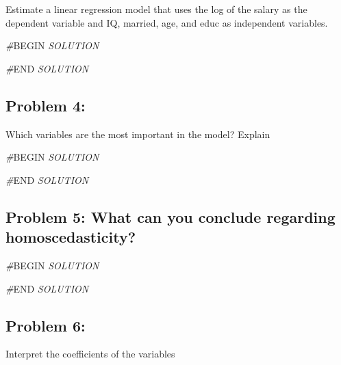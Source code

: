 \documentclass[
]{article}
\newenvironment{Shaded}{\begin{snugshade}}{\end{snugshade}}
\newcommand{\CommentTok}[1]{\textcolor[rgb]{0.56,0.35,0.01}{\textit{#1}}}
\newcommand{\RegionMarkerTok}[1]{#1}
\begin{document}
Estimate a linear regression model that uses the log of the salary as
the dependent variable and IQ, married, age, and educ as independent
variables.

\begin{Shaded}
\begin{Highlighting}[]
\CommentTok{\#}\RegionMarkerTok{BEGIN}\CommentTok{ SOLUTION}


\CommentTok{\#}\RegionMarkerTok{END}\CommentTok{ SOLUTION}
\end{Highlighting}
\end{Shaded}

\hypertarget{problem-4}{%
\subsection{Problem 4:}\label{problem-4}}

Which variables are the most important in the model? Explain

\begin{Shaded}
\begin{Highlighting}[]
\CommentTok{\#}\RegionMarkerTok{BEGIN}\CommentTok{ SOLUTION}


\CommentTok{\#}\RegionMarkerTok{END}\CommentTok{ SOLUTION}
\end{Highlighting}
\end{Shaded}

\hypertarget{problem-5-what-can-you-conclude-regarding-homoscedasticity}{%
\subsection{Problem 5: What can you conclude regarding
homoscedasticity?}\label{problem-5-what-can-you-conclude-regarding-homoscedasticity}}

\begin{Shaded}
\begin{Highlighting}[]
\CommentTok{\#}\RegionMarkerTok{BEGIN}\CommentTok{ SOLUTION}


\CommentTok{\#}\RegionMarkerTok{END}\CommentTok{ SOLUTION}
\end{Highlighting}
\end{Shaded}

\hypertarget{problem-6}{%
\subsection{Problem 6:}\label{problem-6}}

Interpret the coefficients of the variables
\end{document}

